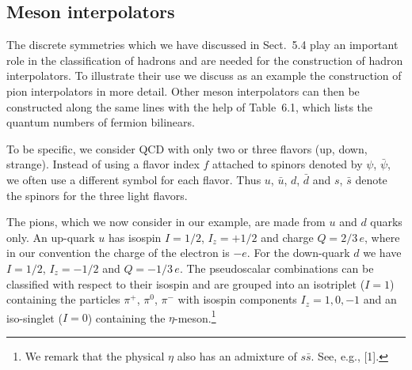 \subsection{Meson interpolators}

The discrete symmetries which we have discussed in Sect.~5.4 play an important
role in the classification of hadrons and are needed for the construction of
hadron interpolators. To illustrate their use we discuss as an example the
construction of pion interpolators in more detail. Other meson interpolators
can then be constructed along the same lines with the help of Table~6.1, which
lists the quantum numbers of fermion bilinears.

To be specific, we consider QCD with only two or three flavors (up, down,
strange). Instead of using a flavor index $f$ attached to spinors denoted by
$\psi$, $\bar\psi$, we often use a different symbol for each flavor. Thus $u$,
$\bar u$, $d$, $\bar d$ and $s$, $\bar s$ denote the spinors for the three
light flavors.

The pions, which we now consider in our example, are made from $u$ and $d$
quarks only. An up-quark $u$ has isospin $I = 1/2$, $I_z = +1/2$ and charge
$Q = 2/3\,e$, where in our convention the charge of the electron is $-e$. For
the down-quark $d$ we have $I = 1/2$, $I_z = -1/2$ and $Q = -1/3\,e$. The
pseudoscalar combinations can be classified with respect to their isospin and
are grouped into an isotriplet ($I = 1$) containing the particles $\pi^+$,
$\pi^0$, $\pi^-$ with isospin components $I_z = 1, 0, -1$ and an iso-singlet
($I = 0$) containing the $\eta$-meson.\footnote{We remark that the physical
$\eta$ also has an admixture of $s\bar s$. See, e.g., [1].}

